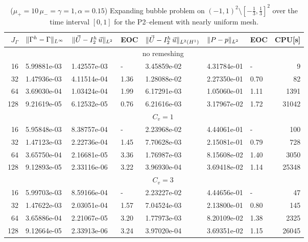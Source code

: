 \begin{table}
\center
\hspace*{-3.25cm}
\begin{tabular}{rllllllr}
\hline
$J_\Gamma$ & $\|\Gamma^h - \Gamma\|_{L^\infty}$ & $\|\vec U - I^h_{2}\,\vec u\|_{L^2}$ & EOC & $\|\vec U - I^h_{2}\,\vec u\|_{L^2(H^1)}$ & $\|P - p\|_{L^2}$ & EOC
& CPU[s] \\
\hline
& \multicolumn{7}{c}{no remeshing} \\
\hline
 16 & 5.99881e-03 & 1.42557e-03 &    - & 3.45859e-02 & 4.31784e-01 &    - &
9 \\
 32 & 1.47936e-03 & 4.11514e-04 & 1.36 & 1.28088e-02 & 2.27350e-01 & 0.70 &
82 \\
 64 & 3.69030e-04 & 1.03424e-04 & 1.99 & 6.17291e-03 & 1.05060e-01 & 1.11 &
1391 \\
128 & 9.21619e-05 & 6.12532e-05 & 0.76 & 6.21616e-03 & 3.17967e-02 & 1.72 &
31042 \\
\hline
& \multicolumn{7}{c}{$C_v=1$} \\
\hline
 16 & 5.95848e-03 & 8.38757e-04 &    - & 2.23968e-02 & 4.44061e-01 &    - &
100 \\
 32 & 1.47123e-03 & 2.22736e-04 & 1.45 & 7.70628e-03 & 2.15081e-01 & 0.79 &
728 \\
 64 & 3.65750e-04 & 2.16681e-05 & 3.36 & 1.76987e-03 & 8.15608e-02 & 1.40 &
3050 \\
128 & 9.12893e-05 & 2.33116e-06 & 3.22 & 3.96930e-04 & 3.69418e-02 & 1.14 &
25348 \\
\hline
& \multicolumn{7}{c}{$C_v=3$} \\
\hline
 16 & 5.99703e-03 & 8.59166e-04 &    - & 2.23227e-02 & 4.44656e-01 &    - &
47 \\
 32 & 1.47622e-03 & 2.03051e-04 & 1.57 & 7.04524e-03 & 2.13800e-01 & 0.80 &
145 \\
 64 & 3.65886e-04 & 2.21067e-05 & 3.20 & 1.77973e-03 & 8.20109e-02 & 1.38 &
2325 \\
128 & 9.12664e-05 & 2.33913e-06 & 3.24 & 3.97020e-04 & 3.69351e-02 & 1.15 &
26045 \\
\hline
\end{tabular}
\hspace*{-3.25cm}
\caption[Stokes expanding bubble uniform mesh errors P2--\pdg]
{($\mu_+ = 10\,\mu_- = \gamma = 1,\alpha = 0.15$) Expanding bubble
problem on $(-1,1)^2\setminus[-\frac{1}{3},\frac{1}{3}]^2$ over the time
interval $[0,1]$ for the P2--\pdg element with nearly uniform mesh.}
\label{tab:expandingbubble2Dp2p1dg}
\end{table}
